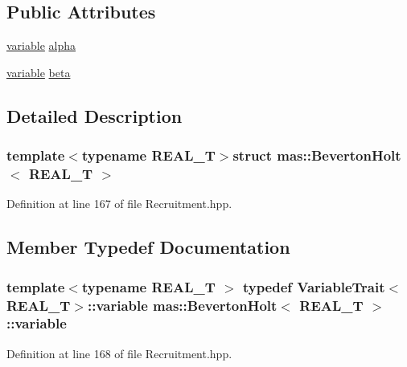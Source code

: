 \subsection*{Public Attributes}
\begin{DoxyCompactItemize}
\item 
\hyperlink{structmas_1_1_beverton_holt_af5114ac8a1dceb03a3148bd6ad7ea57a}{variable} \hyperlink{structmas_1_1_beverton_holt_a65bb63b6533d0a0e71d2b38881664d82}{alpha}
\item 
\hyperlink{structmas_1_1_beverton_holt_af5114ac8a1dceb03a3148bd6ad7ea57a}{variable} \hyperlink{structmas_1_1_beverton_holt_a7a6d8c56eb129b679ceb6d8a4e566fc4}{beta}
\end{DoxyCompactItemize}


\subsection{Detailed Description}
\subsubsection*{template$<$typename R\-E\-A\-L\-\_\-\-T$>$struct mas\-::\-Beverton\-Holt$<$ R\-E\-A\-L\-\_\-\-T $>$}



Definition at line 167 of file Recruitment.\-hpp.



\subsection{Member Typedef Documentation}
\hypertarget{structmas_1_1_beverton_holt_af5114ac8a1dceb03a3148bd6ad7ea57a}{
\subsubsection[{variable}]{\setlength{\rightskip}{0pt plus 5cm}template$<$typename R\-E\-A\-L\-\_\-\-T $>$ typedef {\bf Variable\-Trait}$<$R\-E\-A\-L\-\_\-\-T$>$\-::{\bf variable} {\bf mas\-::\-Beverton\-Holt}$<$ R\-E\-A\-L\-\_\-\-T $>$\-::{\bf variable}}}\label{structmas_1_1_beverton_holt_af5114ac8a1dceb03a3148bd6ad7ea57a}


Definition at line 168 of file Recruitment.\-hpp.



